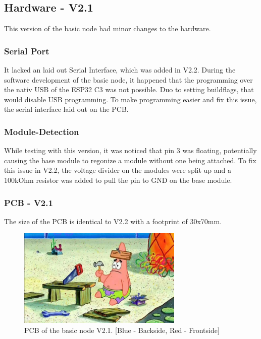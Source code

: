 \subsection{Hardware - V2.1}

    This version of the basic node had minor changes to the hardware. 

    \subsubsection{Serial Port}

        It lacked an laid out Serial Interface, which was added in V2.2.
        During the software development of the basic node, it happened that the 
        programming over the nativ USB of the ESP32 C3 was not possible. Duo to 
        setting buildflags, that would disable USB programming. To make programming
        easier and fix this issue, the serial interface laid out on the PCB. 


    \subsubsection{Module-Detection}
        While testing with this version, it was noticed that pin 3 was floating,
        potentially causing the base module to regonize a module without one being attached.
        To fix this issue in V2.2, the voltage divider on the modules were split up and
        a 100kOhm resistor was added to pull the pin to GND on the base module.
        
    \subsubsection{PCB - V2.1}
        The size of the PCB is identical to V2.2 with a footprint of 30x70mm. 

    \begin{figure}[H]
        \centering
        \includegraphics[width=0.7\textwidth]{assets/HW/TBD.png}
        \caption{PCB of the basic node V2.1. [Blue - Backside, Red - Frontside]}
    \end{figure}


